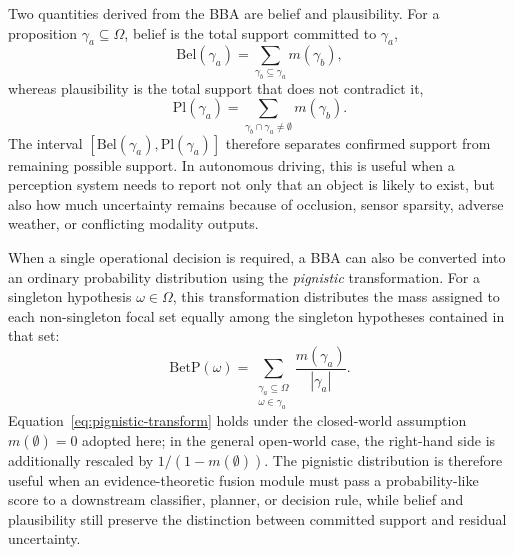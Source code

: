 Two quantities derived from the BBA are belief and plausibility. For a proposition \(\gamma_a \subseteq \Omega\), belief is the total support committed to \(\gamma_a\),
\begin{equation}
\mathrm{Bel}(\gamma_a)=
\sum_{\gamma_b\subseteq \gamma_a}m(\gamma_b),
\end{equation}
whereas plausibility is the total support that does not contradict it,
\begin{equation}
\mathrm{Pl}(\gamma_a)=
\sum_{\gamma_b\cap \gamma_a\neq \emptyset}m(\gamma_b).
\end{equation}
The interval \([\mathrm{Bel}(\gamma_a),\mathrm{Pl}(\gamma_a)]\) therefore separates confirmed support from remaining possible support. In autonomous driving, this is useful when a perception system needs to report not only that an object is likely to exist, but also how much uncertainty remains because of occlusion, sensor sparsity, adverse weather, or conflicting modality outputs.

When a single operational decision is required, a BBA can also be converted into an ordinary probability distribution using the {\em pignistic} transformation. For a singleton hypothesis \(\omega\in\Omega\), this transformation distributes the mass assigned to each non-singleton focal set equally among the singleton hypotheses contained in that set:
\begin{equation}
\mathrm{BetP}(\omega)=
\sum_{\substack{\gamma_a\subseteq\Omega\\ \omega\in\gamma_a}}
\frac{m(\gamma_a)}{|\gamma_a|}.
\label{eq:pignistic-transform}
\end{equation}
Equation~\eqref{eq:pignistic-transform} holds under the closed-world assumption $m(\emptyset)=0$ adopted here; in the general open-world case, the right-hand side is additionally rescaled by $1/(1-m(\emptyset))$.
The pignistic distribution is therefore useful when an evidence-theoretic fusion module must pass a probability-like score to a downstream classifier, planner, or decision rule, while belief and plausibility still preserve the distinction between committed support and residual uncertainty.

